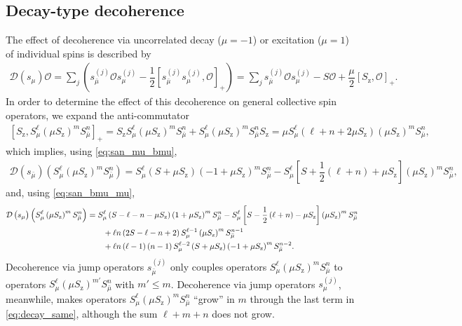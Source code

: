 \documentclass[aps,pra,twocolumn,longbibliography]{revtex4-2}
\newcommand{\f}[2]{\dfrac{#1}{#2}} %
\newcommand{\p}[1]{\left( #1 \right)} %
\renewcommand{\sp}[1]{\left[ #1 \right]} %
\newcommand{\D}{\mathcal{D}}
\renewcommand{\O}{\mathcal{O}}
\newcommand{\z}{\text{z}}
\newcommand{\bmu}{{\bar\mu}}
\newcommand{\1}{\mathds{1}}
\begin{document}
\subsection{Decay-type decoherence}
\label{sec:decay_single}

The effect of decoherence via uncorrelated decay ($\mu=-1$) or
excitation ($\mu=1$) of individual spins is described by
\begin{align}
  \D\p{s_\mu} \O
  = \sum_j\p{s_\bmu^{(j)} \O s_\mu^{(j)}
    - \f12\sp{s_\bmu^{(j)} s_\mu^{(j)},\O}_+}
  = \sum_j s_\bmu^{(j)} \O s_\mu^{(j)}
  - S \O + \f{\mu}{2} \sp{S_\z, \O}_+.
\end{align}
In order to determine the effect of this decoherence on general
collective spin operators, we expand the anti-commutator
\begin{align}
  \sp{S_\z, S_\mu^\ell \p{\mu S_\z}^m S_\bmu^n}_+
  = S_\z S_\mu^\ell \p{\mu S_\z}^m S_\bmu^n
  + S_\mu^\ell \p{\mu S_\z}^m S_\bmu^n S_\z
  = \mu S_\mu^\ell\p{\ell+n+2\mu S_\z} \p{\mu S_\z}^m S_\bmu^n,
\end{align}
which implies, using \eqref{eq:san_mu_bmu},
\begin{align}
  \D\p{s_\bmu} \p{S_\mu^\ell \p{\mu S_\z}^m S_\bmu^n}
  = S_\mu^\ell \p{S+\mu S_\z}\p{-1+\mu S_\z}^m S_\bmu^n
  - S_\mu^\ell\sp{S + \f12\p{\ell+n} + \mu S_\z}
  \p{\mu S_\z}^m S_\bmu^n,
  \label{eq:decay_diff}
\end{align}
and, using \eqref{eq:san_bmu_mu},
\begin{align}
  \D\p{s_\mu} \p{S_\mu^\ell \p{\mu S_\z}^m S_\bmu^n}
  &= S_\mu^\ell \p{S - \ell - n - \mu S_\z} \p{1+\mu S_\z}^m S_\bmu^n
  - S_\mu^\ell\sp{S - \f12\p{\ell+n} - \mu S_\z}
  \p{\mu S_\z}^m S_\bmu^n \notag \\
  &\qquad + \ell n \p{2S - \ell - n + 2}
  S_\mu^{\ell-1} \p{\mu S_\z}^m S_\bmu^{n-1} \notag \\
  &\qquad + \ell n \p{\ell-1} \p{n-1} S_\mu^{\ell-2} \p{S + \mu S_\z}
  \p{-1+\mu S_\z}^m S_\bmu^{n-2}.
  \label{eq:decay_same}
\end{align}
Decoherence via jump operators $s_\bmu^{(j)}$ only couples operators
$S_\mu^\ell \p{\mu S_\z}^m S_\bmu^n$ to operators
$S_\mu^\ell \p{\mu S_\z}^{m'} S_\bmu^n$ with $m'\le m$.  Decoherence
via jump operators $s_\mu^{(j)}$, meanwhile, makes operators
$S_\mu^\ell \p{\mu S_\z}^m S_\bmu^n$ ``grow'' in $m$ through the last
term in \eqref{eq:decay_same}, although the sum $\ell+m+n$ does not
grow.
\end{document}
